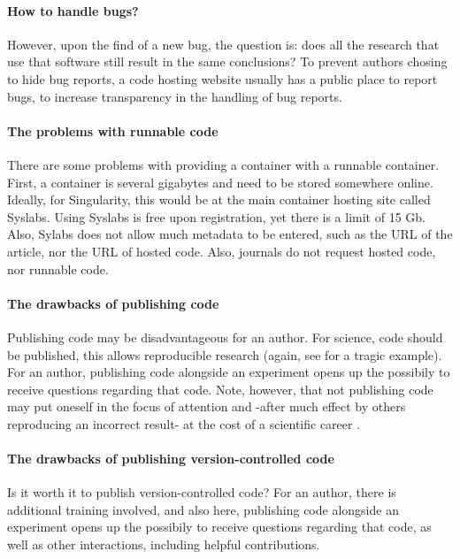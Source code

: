 \paragraph{How to handle bugs?}

However, upon the find of a new bug, the question is:
does all the research that use that software still 
result in the same conclusions?
To prevent authors chosing to hide bug reports, 
a code hosting website usually has a public place to report bugs,
to increase transparency in the handling of bug reports.

\paragraph{The problems with runnable code}

There are some problems with providing a container with a runnable container.
First, a container is several gigabytes and need to be stored somewhere
online. 
Ideally, for Singularity, this would be at the main container hosting
site called Syslabs. Using Syslabs is free upon registration, 
yet there is a limit of 15 Gb. Also, Sylabs does not allow much metadata to
be entered, such as the URL of the article, nor the URL of hosted code.
Also, journals do not request hosted code, nor runnable code.

\paragraph{The drawbacks of publishing code}

Publishing code may be disadvantageous for an author.
For science, code should be published, 
this allows reproducible research 
(again, see \cite{haibe2020importance} for a tragic example).
For an author, publishing code alongside an experiment opens up
the possibily to receive questions regarding that code.
Note, however, that not publishing code may put 
oneself in the focus of attention
and -after much effect by others reproducing an incorrect result-
at the cost of a scientific career \cite{baggerly2009deriving}.

\paragraph{The drawbacks of publishing version-controlled code}

Is it worth it to publish version-controlled code?
For an author, 
there is additional training involved, and also here,
publishing code alongside an experiment opens up
the possibily to receive questions regarding that code,
as well as other interactions, including helpful contributions.

